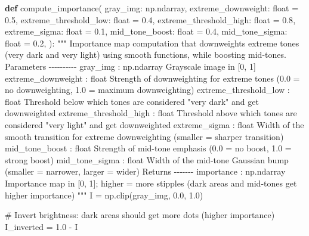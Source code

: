 \documentclass[
  letterpaper,
  DIV=11,
  numbers=noendperiod]{scrartcl}
\newenvironment{Shaded}{\begin{snugshade}}{\end{snugshade}}
\newcommand{\BuiltInTok}[1]{\textcolor[rgb]{0.00,0.23,0.31}{#1}}
\newcommand{\CommentTok}[1]{\textcolor[rgb]{0.37,0.37,0.37}{#1}}
\newcommand{\FloatTok}[1]{\textcolor[rgb]{0.68,0.00,0.00}{#1}}
\newcommand{\KeywordTok}[1]{\textcolor[rgb]{0.00,0.23,0.31}{\textbf{#1}}}
\newcommand{\NormalTok}[1]{\textcolor[rgb]{0.00,0.23,0.31}{#1}}
\newcommand{\OperatorTok}[1]{\textcolor[rgb]{0.37,0.37,0.37}{#1}}
\begin{document}
\label{importance-map}
\begin{Shaded}
\begin{Highlighting}[]
\KeywordTok{def}\NormalTok{ compute\_importance(}
\NormalTok{    gray\_img: np.ndarray,}
\NormalTok{    extreme\_downweight: }\BuiltInTok{float} \OperatorTok{=} \FloatTok{0.5}\NormalTok{,}
\NormalTok{    extreme\_threshold\_low: }\BuiltInTok{float} \OperatorTok{=} \FloatTok{0.4}\NormalTok{,}
\NormalTok{    extreme\_threshold\_high: }\BuiltInTok{float} \OperatorTok{=} \FloatTok{0.8}\NormalTok{,}
\NormalTok{    extreme\_sigma: }\BuiltInTok{float} \OperatorTok{=} \FloatTok{0.1}\NormalTok{,}
\NormalTok{    mid\_tone\_boost: }\BuiltInTok{float} \OperatorTok{=} \FloatTok{0.4}\NormalTok{,}
\NormalTok{    mid\_tone\_sigma: }\BuiltInTok{float} \OperatorTok{=} \FloatTok{0.2}\NormalTok{,}
\NormalTok{):}
    \CommentTok{"""}
\CommentTok{    Importance map computation that downweights extreme tones (very dark and very light)}
\CommentTok{    using smooth functions, while boosting mid{-}tones.}
\CommentTok{    }
\CommentTok{    Parameters}
\CommentTok{    {-}{-}{-}{-}{-}{-}{-}{-}{-}{-}}
\CommentTok{    gray\_img : np.ndarray}
\CommentTok{        Grayscale image in [0, 1]}
\CommentTok{    extreme\_downweight : float}
\CommentTok{        Strength of downweighting for extreme tones (0.0 = no downweighting, 1.0 = maximum downweighting)}
\CommentTok{    extreme\_threshold\_low : float}
\CommentTok{        Threshold below which tones are considered "very dark" and get downweighted}
\CommentTok{    extreme\_threshold\_high : float}
\CommentTok{        Threshold above which tones are considered "very light" and get downweighted}
\CommentTok{    extreme\_sigma : float}
\CommentTok{        Width of the smooth transition for extreme downweighting (smaller = sharper transition)}
\CommentTok{    mid\_tone\_boost : float}
\CommentTok{        Strength of mid{-}tone emphasis (0.0 = no boost, 1.0 = strong boost)}
\CommentTok{    mid\_tone\_sigma : float}
\CommentTok{        Width of the mid{-}tone Gaussian bump (smaller = narrower, larger = wider)}
\CommentTok{    }
\CommentTok{    Returns}
\CommentTok{    {-}{-}{-}{-}{-}{-}{-}}
\CommentTok{    importance : np.ndarray}
\CommentTok{        Importance map in [0, 1]; higher = more stipples (dark areas and mid{-}tones get higher importance)}
\CommentTok{    """}
\NormalTok{    I }\OperatorTok{=}\NormalTok{ np.clip(gray\_img, }\FloatTok{0.0}\NormalTok{, }\FloatTok{1.0}\NormalTok{)}
    
    \CommentTok{\# Invert brightness: dark areas should get more dots (higher importance)}
\NormalTok{    I\_inverted }\OperatorTok{=} \FloatTok{1.0} \OperatorTok{{-}}\NormalTok{ I}
    

\end{Highlighting}
\end{Shaded}
\end{document}
